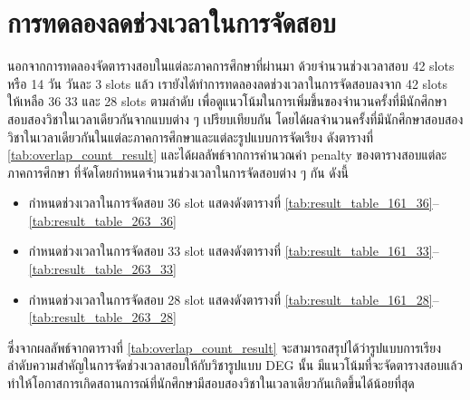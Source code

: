 \section{การทดลองลดช่วงเวลาในการจัดสอบ}
นอกจากการทดลองจัดตารางสอบในแต่ละภาคการศึกษาที่ผ่านมา ด้วยจำนวนช่วงเวลาสอบ 42 slots หรือ 14 วัน วันละ 3 slots แล้ว
เรายังได้ทำการทดลองลดช่วงเวลาในการจัดสอบลงจาก 42 slots ให้เหลือ 36 33 และ 28 slots ตามลำดับ
เพื่อดูแนวโน้มในการเพิ่มขึ้นของจำนวนครั้งที่มีนักศึกษาสอบสองวิชาในเวลาเดียวกันจากแบบต่าง ๆ เปรียบเทียบกัน
โดยได้ผลจำนวนครั้งที่มีนักศึกษาสอบสองวิชาในเวลาเดียวกันในแต่ละภาคการศึกษาและแต่ละรูปแบบการจัดเรียง ดังตารางที่ \ref{tab:overlap_count_result}
และได้ผลลัพธ์จากการคำนวณค่า penalty ของตารางสอบแต่ละภาคการศึกษา ที่จัดโดยกำหนดจำนวนช่วงเวลาในการจัดสอบต่าง ๆ กัน ดังนี้
\begin{itemize}
    \item กำหนดช่วงเวลาในการจัดสอบ 36 slot แสดงดังตารางที่ \ref{tab:result_table_161_36}--\ref{tab:result_table_263_36}
    \item กำหนดช่วงเวลาในการจัดสอบ 33 slot แสดงดังตารางที่ \ref{tab:result_table_161_33}--\ref{tab:result_table_263_33}
    \item กำหนดช่วงเวลาในการจัดสอบ 28 slot แสดงดังตารางที่ \ref{tab:result_table_161_28}--\ref{tab:result_table_263_28}
\end{itemize}
ซึ่งจากผลลัพธ์จากตารางที่ \ref{tab:overlap_count_result} จะสามารถสรุปได้ว่ารูปแบบการเรียงลำดับความสำคัญในการจัดช่วงเวลาสอบให้กับวิชารูปแบบ DEG นั้น 
มีแนวโน้มที่จะจัดตารางสอบแล้วทำให้โอกาสการเกิดสถานการณ์ที่นักศึกษามีสอบสองวิชาในเวลาเดียวกันเกิดขึ้นได้น้อยที่สุด
